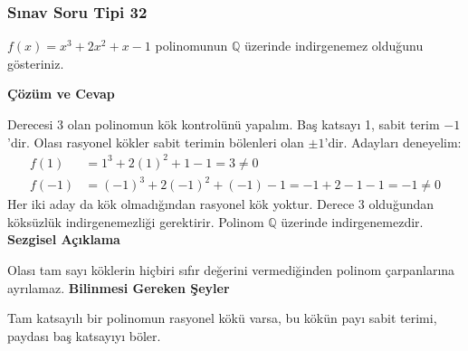 \documentclass[11pt, a4paper]{article}
\newenvironment{cozum}{
    \vspace{0.5cm}
    \noindent\textcolor{green!60!black}{\faCheckCircle\enspace \textbf{\Large Çözüm ve Cevap}}\par\vspace{0.2cm}
}{}
\newenvironment{sezgisel}{
    \vspace{0.5cm}
    \noindent\textcolor{orange!80!black}{\faLightbulb\enspace \textbf{\Large Sezgisel Açıklama}}\par\vspace{0.2cm}
    \itshape
}{}
\newenvironment{bilgi}{
    \vspace{0.5cm}
    \noindent\textcolor{red!70!black}{\faExclamationTriangle\enspace \textbf{\Large Bilinmesi Gereken Şeyler}}\par\vspace{0.2cm}
}{}
\begin{document}
\subsubsection{Sınav Soru Tipi 32}
\begin{sinavbox}
$f(x) = x^3+2x^2+x-1$ polinomunun $\mathbb{Q}$ üzerinde indirgenemez olduğunu gösteriniz.
\end{sinavbox}
\begin{cozum}
Derecesi 3 olan polinomun kök kontrolünü yapalım.
Baş katsayı 1, sabit terim $-1$'dir. Olası rasyonel kökler sabit terimin bölenleri olan $\pm 1$'dir.
Adayları deneyelim:
\begin{align*}
f(1) &= 1^3 + 2(1)^2 + 1 - 1 = 3 \neq 0 \\
f(-1) &= (-1)^3 + 2(-1)^2 + (-1) - 1 = -1 + 2 - 1 - 1 = -1 \neq 0
\end{align*}
Her iki aday da kök olmadığından rasyonel kök yoktur. Derece 3 olduğundan köksüzlük indirgenemezliği gerektirir. Polinom $\mathbb{Q}$ üzerinde indirgenemezdir.
\end{cozum}
\begin{sezgisel}
Olası tam sayı köklerin hiçbiri sıfır değerini vermediğinden polinom çarpanlarına ayrılamaz.
\end{sezgisel}
\begin{bilgi}
Tam katsayılı bir polinomun rasyonel kökü varsa, bu kökün payı sabit terimi, paydası baş katsayıyı böler.
\end{bilgi}

\newpage
\end{document}
